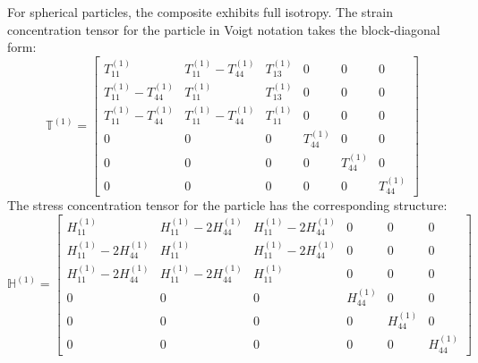 \documentclass[oneside, 12pt, a4paper, bibliography=totoc]{book}
\begin{document}
For spherical particles, the composite exhibits full isotropy. The strain concentration tensor for the particle in Voigt notation takes the block-diagonal form:
%
\begin{equation}
    \mathbb{T}^{(1)} =
    \begin{bmatrix}
        T_{11}^{(1)}  & T_{11}^{(1)} - T_{44}^{(1)} & T_{13}^{(1)} & 0 & 0 & 0 \\[4pt]
        T_{11}^{(1)} - T_{44}^{(1)} &  T_{11}^{(1)} & T_{13}^{(1)} & 0 & 0 & 0 \\[4pt]
        T_{11}^{(1)} - T_{44}^{(1)} & T_{11}^{(1)} - T_{44}^{(1)} & T_{11}^{(1)} & 0 & 0 & 0 \\[4pt]
        0 & 0 & 0 & T_{44}^{(1)} & 0 & 0 \\[4pt]
        0 & 0 & 0 & 0 & T_{44}^{(1)} & 0 \\[4pt]
        0 & 0 & 0 & 0 & 0 & T_{44}^{(1)}
    \end{bmatrix}
    \label{eq:T_particle_interface_csa}
\end{equation}
%
The stress concentration tensor for the particle has the corresponding structure:
%
\begin{equation}
    \mathbb{H}^{(1)} =
    \begin{bmatrix}
        H_{11}^{(1)} & H_{11}^{(1)} - 2H_{44}^{(1)} & H_{11}^{(1)} - 2H_{44}^{(1)} & 0 & 0 & 0 \\[4pt]
        H_{11}^{(1)} - 2H_{44}^{(1)} & H_{11}^{(1)} & H_{11}^{(1)} - 2H_{44}^{(1)} & 0 & 0 & 0 \\[4pt]
        H_{11}^{(1)} - 2H_{44}^{(1)} & H_{11}^{(1)} - 2H_{44}^{(1)} & H_{11}^{(1)} & 0 & 0 & 0 \\[4pt]
        0 & 0 & 0 & H_{44}^{(1)} & 0 & 0 \\[4pt]
        0 & 0 & 0 & 0 & H_{44}^{(1)} & 0 \\[4pt]
        0 & 0 & 0 & 0 & 0 & H_{44}^{(1)}
    \end{bmatrix}
    \label{eq:H_particle_interface_csa}
\end{equation}
\end{document}
